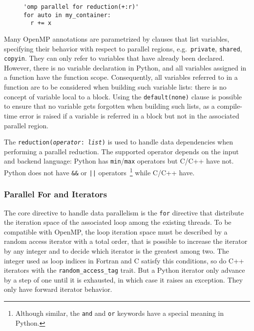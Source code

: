 \documentclass{llncs}
\begin{document}
\begin{figure}
    \begin{lstlisting}[label={lst:instruction-annotation}, caption={Parallel
    loop with reduction annotated with OpenMP directive.}]
'omp parallel for reduction(+:r)'
for auto in my_container:
  r += x
  \end{lstlisting}
\end{figure}

Many OpenMP annotations are parametrized by clauses that list variables,
specifying their behavior with respect to parallel regions, e.g.\
\texttt{private}, \texttt{shared}, \texttt{copyin}. They can only refer to
variables that have already been declared. However, there is no variable
declaration in Python, and all variables assigned in a function have the
function scope. Consequently, all variables referred to in a function are to be
considered when building such variable lists: there is no concept of variable
local to a block. Using the \texttt{default(none)} clause is possible to ensure
that no variable gets forgotten when building such lists, as a compile-time
error is raised if a variable is referred in a block but not in the associated
parallel region.

The \texttt{reduction(\emph{operator}: \emph{list})} is used to handle data
dependencies when performing a parallel reduction. The supported operator
depends on the input and backend language: Python has \texttt{min}/\texttt{max} operators but
C/C++ have not. Python does not have \texttt{\&\&} or \texttt{||}
operators~\footnote{Although similar, the \texttt{and} and \texttt{or} keywords
have a special meaning in Python.} while C/C++ have.

\subsubsection{Parallel For and Iterators}

The core directive to handle data parallelism is the \texttt{for} directive that
distribute the iteration space of the associated loop among the existing
threads. To be compatible with OpenMP, the loop iteration space must be
described by a random access iterator with a total order, that is possible
to increase the iterator by any integer and to decide which iterator is the
greatest among two. The integer used as loop indices in Fortran and C satisfy
this conditions, so do C++ iterators with the \texttt{random\_access\_tag}
trait. But a Python iterator only advance by a step of one until it is
exhausted, in which case it raises an exception. They only have forward iterator
behavior.
\end{document}
